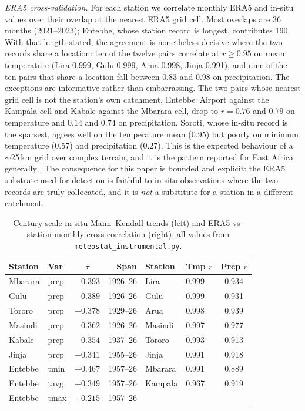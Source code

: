 \documentclass[preprint,12pt]{elsarticle}
\begin{document}
\emph{ERA5 cross-validation.} For each station we correlate monthly ERA5 and
in-situ values over their overlap at the nearest ERA5 grid cell. Most overlaps are
36 months (2021--2023); Entebbe, whose station record is longest, contributes 190.
With that length stated, the agreement is nonetheless decisive where the two
records share a location: ten of the twelve pairs correlate at $r\geq0.95$ on
mean temperature (Lira 0.999, Gulu 0.999, Arua 0.998, Jinja 0.991), and nine of
the ten pairs that share a location fall between 0.83 and 0.98 on precipitation.
The exceptions are informative rather than embarrassing. The two pairs whose
nearest grid cell is not the station's own catchment, Entebbe~Airport against the
Kampala cell and Kabale against the Mbarara cell, drop to $r=0.76$ and $0.79$ on
temperature and $0.14$ and $0.74$ on precipitation. Soroti, whose in-situ record is
the sparsest, agrees well on the temperature mean (0.95) but poorly on minimum
temperature (0.57) and precipitation (0.27). This is the expected behaviour of a
$\sim$25\,km grid over complex terrain, and it is the pattern reported for East
Africa generally \cite{gleixner2020}. The consequence for this paper is bounded and
explicit: the ERA5 substrate used for detection is faithful to in-situ observations
where the two records are truly collocated, and it is \emph{not} a substitute for a
station in a different catchment.

\begin{table}[h]
\centering\small
\caption{Century-scale in-situ Mann--Kendall trends (left) and ERA5-vs-station
monthly cross-correlation (right); all values from
\texttt{meteostat\_instrumental.py}.}
\label{tab:insitu}
\begin{tabular}{llcrllc}
\toprule
Station & Var & $\tau$ & Span & Station & Tmp $r$ & Prcp $r$ \\
\midrule
Mbarara & prcp & $-0.393$ & 1926--26 & Lira   & 0.999 & 0.934 \\
Gulu    & prcp & $-0.389$ & 1926--26 & Gulu   & 0.999 & 0.931 \\
Tororo  & prcp & $-0.378$ & 1929--26 & Arua   & 0.998 & 0.939 \\
Masindi & prcp & $-0.362$ & 1926--26 & Masindi& 0.997 & 0.977 \\
Kabale  & prcp & $-0.354$ & 1937--26 & Tororo & 0.993 & 0.913 \\
Jinja   & prcp & $-0.341$ & 1955--26 & Jinja  & 0.991 & 0.918 \\
Entebbe & tmin & $+0.467$ & 1957--26 & Mbarara& 0.991 & 0.889 \\
Entebbe & tavg & $+0.349$ & 1957--26 & Kampala& 0.967 & 0.919 \\
Entebbe & tmax & $+0.215$ & 1957--26 & & & \\
\bottomrule
\end{tabular}
\end{table}
\end{document}
